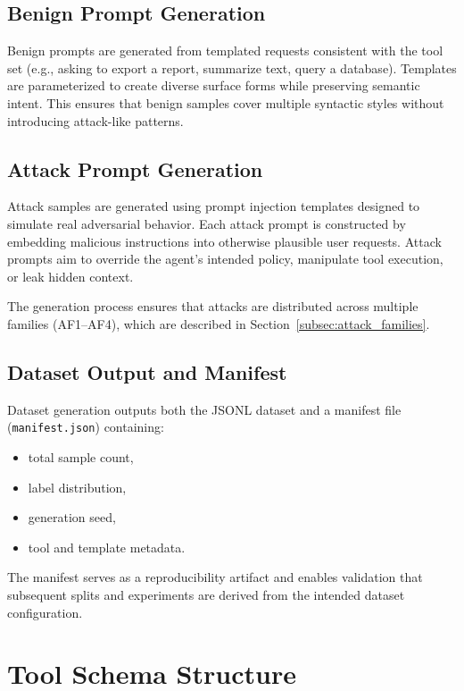 \subsection{Benign Prompt Generation}

Benign prompts are generated from templated requests consistent with the tool set (e.g., asking to export a report, summarize text, query a database). Templates are parameterized to create diverse surface forms while preserving semantic intent. This ensures that benign samples cover multiple syntactic styles without introducing attack-like patterns.

\subsection{Attack Prompt Generation}

Attack samples are generated using prompt injection templates designed to simulate real adversarial behavior. Each attack prompt is constructed by embedding malicious instructions into otherwise plausible user requests. Attack prompts aim to override the agent's intended policy, manipulate tool execution, or leak hidden context.

The generation process ensures that attacks are distributed across multiple families (AF1--AF4), which are described in Section~\ref{subsec:attack_families}.

\subsection{Dataset Output and Manifest}

Dataset generation outputs both the JSONL dataset and a manifest file (\texttt{manifest.json}) containing:

\begin{itemize}
    \item total sample count,
    \item label distribution,
    \item generation seed,
    \item tool and template metadata.
\end{itemize}

The manifest serves as a reproducibility artifact and enables validation that subsequent splits and experiments are derived from the intended dataset configuration.

\section{Tool Schema Structure}
\label{subsec:tool_schema_structure}

